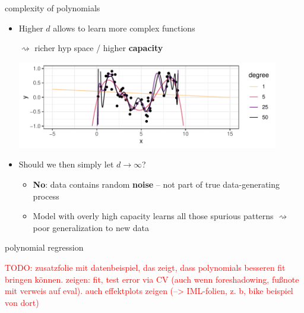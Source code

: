 \documentclass[11pt,compress,t,notes=noshow, xcolor=table]{beamer}
\begin{document}
\begin{vbframe}{complexity of polynomials}

\begin{itemize}
  \item Higher $d$ allows to learn more complex functions 
  
  $\rightsquigarrow$ richer hyp space / higher \textbf{capacity}
  
  \vfill
  \includegraphics[width=0.9\textwidth]{figure/reg_poly_univ_4}
  \item Should we then simply let $d \rightarrow \infty$?
  \begin{itemize}
    \item \textbf{No}: data contains random \textbf{noise} -- not part of true
    data-generating process
    \item Model with overly high capacity learns all those spurious patterns
    $\rightsquigarrow$ poor generalization to new data
  \end{itemize}
\end{itemize}

\end{vbframe}



\begin{frame}{polynomial regression}

\textcolor{red}{TODO: zusatzfolie mit datenbeispiel, das zeigt, dass polynomials 
besseren fit bringen können. zeigen: fit, test error via CV (auch wenn 
foreshadowing, fußnote mit verweis auf eval). auch effektplots zeigen 
(--> IML-folien, z. b, bike beispiel von dort)}

\end{frame}


\endlecture
\end{document}
